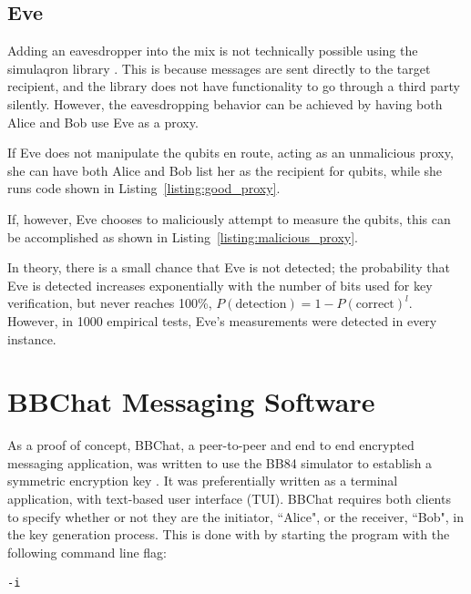 \subsection{Eve}
Adding an eavesdropper into the mix is not technically possible using the simulaqron library \cite{simulaqron}.
This is because messages are sent directly to the target recipient, and the library does not have functionality to go through a third party silently.
However, the eavesdropping behavior can be achieved by having both Alice and Bob use Eve as a proxy.

If Eve does not manipulate the qubits en route, acting as an unmalicious proxy, she can have both Alice and Bob list her as the recipient for qubits, while she runs code shown in Listing~\ref{listing:good_proxy}.
\begin{figure}[htp]
\noindent
\begin{minipage}{\linewidth}
\begin{singlespace}

\end{singlespace}
\end{minipage}
\end{figure}
If, however, Eve chooses to maliciously attempt to measure the qubits, this can be accomplished as shown in Listing~\ref{listing:malicious_proxy}.
\begin{figure}[htp]
\noindent
\begin{minipage}{\linewidth}
\begin{singlespace}

\end{singlespace}
\end{minipage}
\end{figure}
In theory, there is a small chance that Eve is not detected; the probability that Eve is detected increases exponentially with the number of bits used for key verification, but never reaches 100\%, $P(\textrm{detection}) = 1 - P(\textrm{correct})^l$.
However, in 1000 empirical tests, Eve's measurements were detected in every instance.

\section{BBChat Messaging Software}
As a proof of concept, BBChat, a peer-to-peer and end to end encrypted messaging application, was written to use the BB84 simulator to establish a symmetric encryption key \cite{bbchat}.
It was preferentially written as a terminal application, with text-based user interface (TUI).
BBChat requires both clients to specify whether or not they are the initiator, ``Alice", or the receiver, ``Bob", in the key generation process.
This is done with by starting the program with the following command line flag: \begin{verbatim}-i\end{verbatim}


